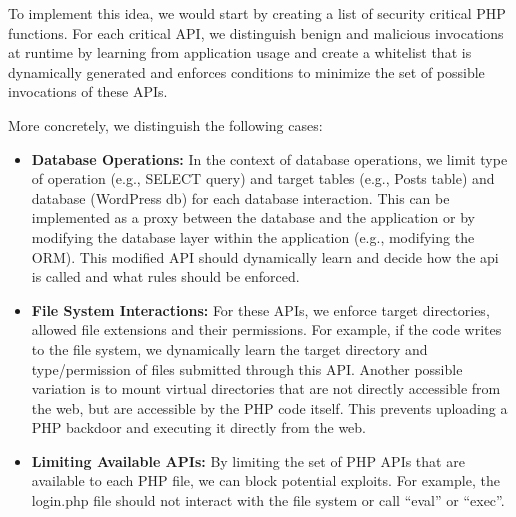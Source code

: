 To implement this idea, we would start by creating a list of security critical PHP functions.
For each critical API, we distinguish benign and malicious invocations at runtime by learning from application usage and create a whitelist that is dynamically generated and enforces conditions to minimize the set of possible invocations of these APIs.

More concretely, we distinguish the following cases:
\begin{itemize}
  \item \textbf{Database Operations:} In the context of database operations, we limit type of operation (e.g., SELECT query) and target tables (e.g., Posts table) and database (WordPress db) for each database interaction. This can be implemented as a proxy between the database and the application or by modifying the database layer within the application (e.g., modifying the ORM). This modified API should dynamically learn and decide how the api is called and what rules should be enforced.
  \item \textbf{File System Interactions:} For these APIs, we enforce target directories, allowed file extensions and their permissions. For example, if the code writes to the file system, we dynamically learn the target directory and type/permission of files submitted through this API.
  Another possible variation is to mount virtual directories that are not directly accessible from the web, but are accessible by the PHP code itself. This prevents uploading a PHP backdoor and executing it directly from the web.
  \item \textbf{Limiting Available APIs:} By limiting the set of PHP APIs that are available to each PHP file, we can block potential exploits. For example, the login.php file should not interact with the file system or call ``eval'' or ``exec''.
\end{itemize}
